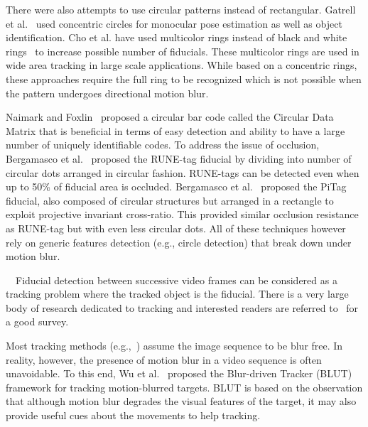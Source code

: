 \documentclass[10pt,twocolumn,letterpaper]{article}
\begin{document}
There were also attempts to use circular patterns instead of rectangular.
Gatrell et al.~\cite{concentric} used concentric circles
for monocular pose estimation as well as object identification. Cho et al.
\cite{Cho:2001,Cho97fastcolor} have used multicolor rings instead of black and white rings~\cite{concentric} to increase possible number of fiducials.
These multicolor rings are used in wide area tracking in large scale
applications.  While based on a concentric rings, these approaches require
the full ring to be recognized which is not possible when the pattern undergoes directional
motion blur.

Naimark and Foxlin~\cite{NaimarkF02} proposed a circular bar code
called the Circular Data Matrix that is beneficial in terms of
easy detection and ability to have a large number
of uniquely identifiable codes.  To address the issue of occlusion,
Bergamasco et al.~\cite{runetag11} proposed the RUNE-tag fiducial by dividing
into number of circular dots arranged in circular fashion. RUNE-tags can be
detected even when up to 50\% of fiducial area is occluded. Bergamasco et
al.~\cite{Pitag13} proposed the PiTag fiducial, also composed of circular
structures but arranged in a rectangle to exploit projective invariant cross-ratio.
This provided similar occlusion resistance as RUNE-tag but with even less
circular dots. All of these techniques however rely on generic features
detection (e.g., circle detection) that break down under motion blur.


~~Fiducial detection between successive video
frames can be considered as a tracking problem where the tracked object is
the fiducial.  There is a very large body of research dedicated to tracking and interested readers are referred to~\cite{Yilmaz:2006} for a good survey.

Most tracking methods (e.g.,~\cite{Ross:2008,Wu:2009,Perez02,Mei:2009}) assume
the image sequence to be blur free. In reality, however, the presence of motion blur in
a video sequence is often unavoidable. To this end, Wu et al.~\cite{Wu:2011}
proposed the Blur-driven Tracker (BLUT) framework for tracking motion-blurred targets. BLUT
is based on the observation that although motion blur degrades the visual
features of the target, it may also provide useful cues about the
movements to help tracking.
\end{document}
